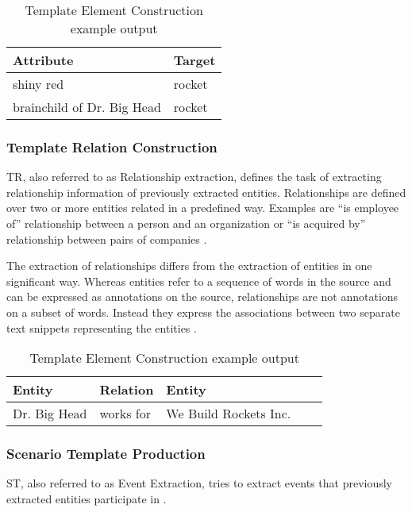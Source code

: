 \begin{table}[H]
\centering
\begin{tabular*}{\textwidth}{ l  l }
	\toprule
	\textbf{Attribute} & \textbf{Target} \\
	\midrule
	shiny red & rocket \\
	brainchild of Dr. Big Head & rocket \\
	\bottomrule
\end{tabular*}
\caption{Template Element Construction example output}
\end{table}

\subsubsection{Template Relation Construction}
\gls{TR}, also referred to as Relationship extraction, defines the task of extracting relationship information of previously extracted entities. Relationships are defined over two or more entities related in a predefined way. Examples are \enquote{is employee of} relationship between a person and an organization or \enquote{is acquired by} relationship between pairs of companies \cite{Sarawagi:2008}.

The extraction of relationships differs from the extraction of entities in one significant way. Whereas entities refer to a sequence of words in the source and can be expressed as annotations on the source, relationships are not annotations on a subset of words. Instead they express the associations between two separate text snippets representing the entities \cite{Sarawagi:2008}.

\begin{table}[H]
\centering
\begin{tabular*}{\textwidth}{ l l l l l }
	\toprule
	\textbf{Entity} & \textbf{Relation}  & \textbf{Entity} \\
	\midrule
	Dr. Big Head & works for & We Build Rockets Inc. \\
	\bottomrule
\end{tabular*}
\caption{Template Element Construction example output}
\end{table}

\subsubsection{Scenario Template Production}
\gls{ST}, also referred to as Event Extraction, tries to extract events that previously extracted entities participate in \cite{Cunningham:2005}.

